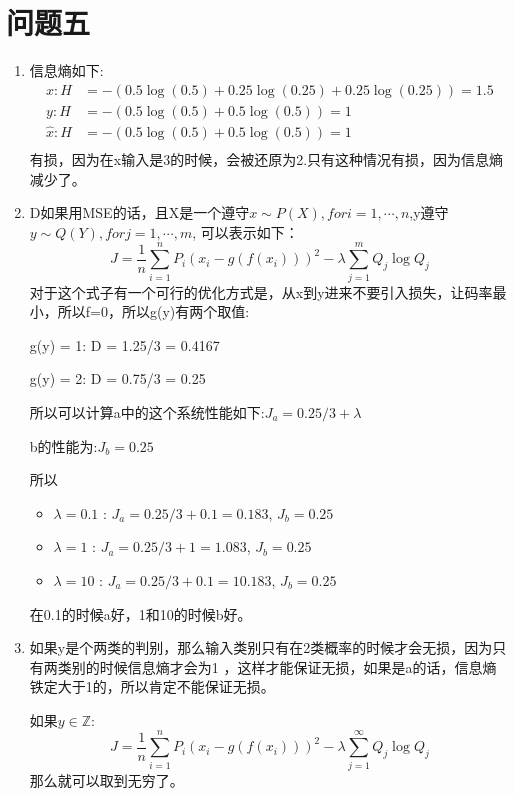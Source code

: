 \documentclass[answers]{exam}  %
\begin{document}
\section{问题五}
\begin{enumerate}[label=\alph*.] 
    \item 信息熵如下:
    \begin{align*}
        x: H &= -(0.5\log(0.5) + 0.25\log(0.25) + 0.25\log(0.25)) = 1.5\\
        y: H &= -(0.5\log(0.5) + 0.5\log(0.5)) = 1\\
        \hat{x}: H &= -(0.5\log(0.5) + 0.5\log(0.5)) = 1\\
    \end{align*}
    有损，因为在x输入是3的时候，会被还原为2.只有这种情况有损，因为信息熵减少了。

    \item D如果用MSE的话，且X是一个遵守$x\sim P(X),for i =1,\cdots, n$,y遵守$y\sim Q(Y),for j = 1,\cdots, m$, 可以表示如下：
    \begin{equation*}
        J = \frac{1}{n} \sum_{i=1}^{n} P_i\left(x_i - g(f(x_i))\right)^2 - \lambda \sum_{j=1}^{m}Q_j \log Q_j
    \end{equation*}
    对于这个式子有一个可行的优化方式是，从x到y进来不要引入损失，让码率最小，所以f=0，所以g(y)有两个取值:
    \par g(y) = 1: D = 1.25/3 = 0.4167
    \par g(y) = 2: D = 0.75/3 = 0.25
    \par 所以可以计算a中的这个系统性能如下:$J_a = 0.25/3 + \lambda$
    \par b的性能为:$J_b = 0.25$
    \par 所以
    \begin{itemize}
        \item $\lambda = 0.1$ : $J_a = 0.25/3 + 0.1 = 0.183$, $J_b = 0.25$
        \item $\lambda = 1$ : $J_a = 0.25/3 + 1 = 1.083$, $J_b = 0.25$
        \item $\lambda = 10$ : $J_a = 0.25/3 + 0.1 = 10.183$, $J_b = 0.25$
    \end{itemize}
    在0.1的时候a好，1和10的时候b好。
    \item 如果y是个两类的判别，那么输入类别只有在2类概率的时候才会无损，因为只有两类别的时候信息熵才会为1
    ，这样才能保证无损，如果是a的话，信息熵铁定大于1的，所以肯定不能保证无损。

    如果$y\in \mathbb{Z}$:
    \begin{equation*}
        J = \frac{1}{n} \sum_{i=1}^{n} P_i\left(x_i - g(f(x_i))\right)^2 - \lambda \sum_{j=1}^{\infty}Q_j \log Q_j
    \end{equation*}
    那么就可以取到无穷了。


\end{enumerate}
\end{document}
